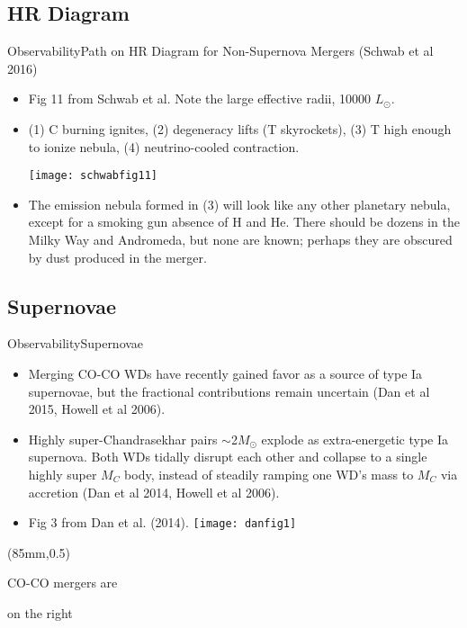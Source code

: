 \documentclass{beamer}
\begin{document}
\subsection{HR Diagram}

\begin{frame}{Observability}{Path on HR Diagram for Non-Supernova Mergers (Schwab et al 2016)}
  \begin{itemize}
    \item {Fig 11 from Schwab et al. Note the large effective radii, 10000 $L_{\odot}$.}
    \item {(1) C burning ignites, (2) degeneracy lifts (T skyrockets), (3) T high enough to ionize nebula, (4) neutrino-cooled contraction.}
      \begin{center}\texttt{[image: schwabfig11]}\end{center}
      \item {The emission nebula formed in (3) will look like any other planetary nebula, except for a smoking gun absence of H and He. There should be dozens in the Milky Way and Andromeda, but none are known; perhaps they are obscured by dust produced in the merger.}
  \end{itemize}
\end{frame}

\subsection{Supernovae}

\begin{frame}{Observability}{Supernovae}
  \begin{itemize}
    \item{Merging CO-CO WDs have recently gained favor as a source of type Ia supernovae, but the fractional contributions remain uncertain (Dan et al 2015, Howell et al 2006).}
    \item{Highly super-Chandrasekhar pairs $\sim$2$M_{\odot}$ explode as extra-energetic type Ia supernova. Both WDs tidally disrupt each other and collapse to a single highly super $M_C$ body, instead of steadily ramping one WD's mass to $M_C$ via accretion (Dan et al 2014, Howell et al 2006).}
    \item {Fig 3 from Dan et al. (2014). }
      \texttt{[image: danfig1]}
  \end{itemize}
\begin{textblock*}{64mm}(85mm,0.5\textheight)
\begin{exampleblock}{}
CO-CO mergers are 

on the right
\end{exampleblock}
\end{textblock*}


\end{frame}
\end{document}
